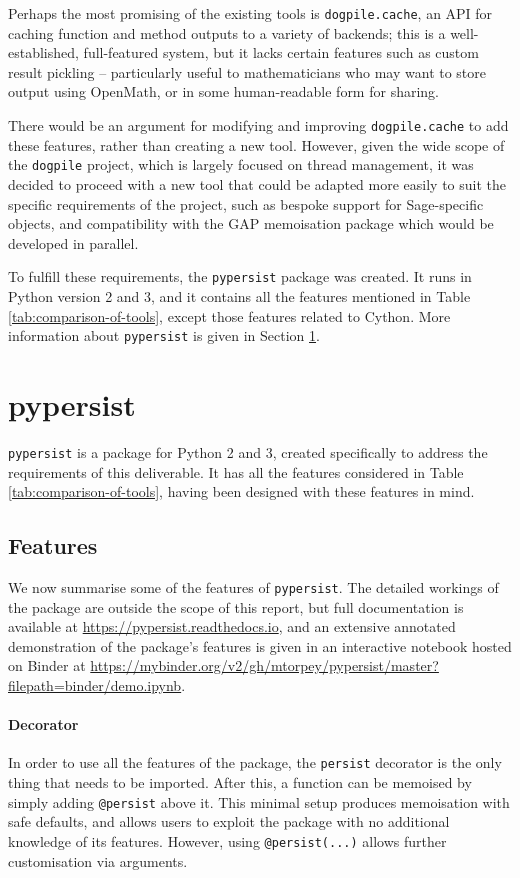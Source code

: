 \documentclass{deliverablereport}
\newcommand{\pypersist}{\texttt{pypersist}}
\begin{document}
Perhaps the most promising of the existing tools is \texttt{dogpile.cache}, an
API for caching function and method outputs to a variety of backends; this is a
well-established, full-featured system, but it lacks certain features such as
custom result pickling -- particularly useful to mathematicians who may want to
store output using OpenMath, or in some human-readable form for sharing.

There would be an argument for modifying and improving \texttt{dogpile.cache} to
add these features, rather than creating a new tool.  However, given the wide
scope of the \texttt{dogpile} project, which is largely focused on thread
management, it was decided to proceed with a new tool that could be adapted more
easily to suit the specific requirements of the project, such as bespoke support
for Sage-specific objects, and compatibility with the GAP memoisation package
which would be developed in parallel.

To fulfill these requirements, the \pypersist{} package was created.  It runs in
Python version 2 and 3, and it contains all the features mentioned in Table
\ref{tab:comparison-of-tools}, except those features related to Cython.  More
information about \pypersist{} is given in Section \ref{sec:pypersist}.

\section{pypersist}
\label{sec:pypersist}

\pypersist{} is a package for Python 2 and 3, created specifically to address
the requirements of this deliverable.  It has all the features considered in
Table \ref{tab:comparison-of-tools}, having been designed with these features in
mind.

\subsection{Features}
\label{sec:features}

We now summarise some of the features of \pypersist{}.  The detailed workings of
the package are outside the scope of this report, but full documentation is
available at \url{https://pypersist.readthedocs.io}, and an extensive annotated
demonstration of the package's features is given in an interactive notebook
hosted on Binder at
\url{https://mybinder.org/v2/gh/mtorpey/pypersist/master?filepath=binder/demo.ipynb}.

\paragraph{Decorator}
In order to use all the features of the package, the \texttt{persist} decorator
is the only thing that needs to be imported.  After this, a function can be
memoised by simply adding \texttt{@persist} above it.  This minimal setup
produces memoisation with safe defaults, and allows users to exploit the package
with no additional knowledge of its features.  However, using
\texttt{@persist(...)} allows further customisation via arguments.
\end{document}
